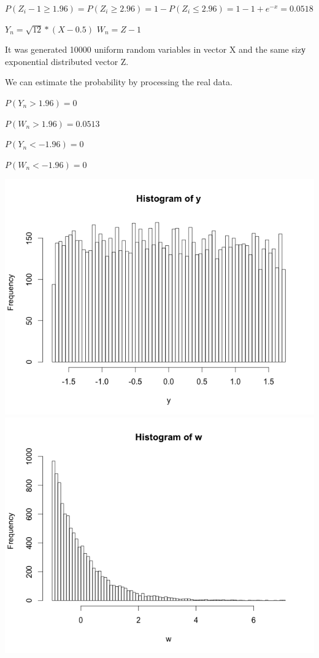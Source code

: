 \documentclass[12pt]{article}
\begin{document}
\begin{list}{()~}{}
\begin{list}{)~}{}
\item $P\left(Z_i-1\geq 1.96\right)=P\left(Z_i\geq 2.96\right)=1-P\left(Z_i\leq 2.96\right)=1-1+e^{-x}=0.0518$
\end{list}

\item

$Y_n = \sqrt{12}*(X-0.5)$
$W_n = Z - 1$

It was generated 10000 uniform random variables in vector X and the same sizу exponential distributed vector Z.

We can estimate the probability by processing the real data.

$P(Y_n > 1.96) = 0$

$P(W_n > 1.96) = 0.0513$

$P(Y_n < -1.96) = 0$

$P(W_n < -1.96) = 0$ 

\includegraphics[width=1\textwidth]{Rplot.png}
\includegraphics[width=1\textwidth]{Rplot04.png}


\end{list}
\end{document}
